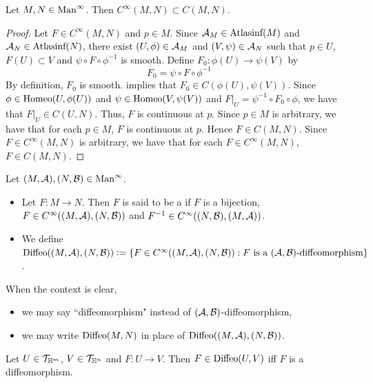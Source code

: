 \documentclass{book}
\begin{document}
\begin{ex} 
	Let $M, N \in \text{Man}^{\infty}$. Then $C^{\infty}(M,N) \subset C(M, N)$.
\end{ex}

\begin{proof}
	Let $F \in C^{\infty}(M,N)$ and $p \in M$. Since $\mathcal{A}_M \in \operatorname{\text{Atlasinf}}(M)$ and $\mathcal{A}_N \in \operatorname{\text{Atlasinf}}(N)$, there exist $(U, \phi) \in \mathcal{A}_M$ and $(V, \psi) \in \mathcal{A}_N$ such that $p \in U$, $F(U) \subset V$ and $\psi \circ F \circ \phi^{-1}$ is smooth. Define $F_0: \phi(U) \rightarrow \psi(V) $ by $$ F_0 = \psi \circ F \circ \phi^{-1}$$  
	By definition, $F_0$ is smooth.  implies that $F_0 \in C(\phi(U), \psi(V))$. Since $\phi \in \operatorname{\text{Homeo}}(U, \phi(U))$ and $\psi \in \operatorname{\text{Homeo}}(V, \psi(V))$ and $F|_U = \psi^{-1} \circ F_0 \circ \phi$, we have that $F|_U \in C(U, N)$. Thus, $F$ is continuous at $p$. Since $p \in M$ is arbitrary, we have that for each $p \in M$, $F$ is continuous at $p$. Hence $F \in C(M,N)$. Since $F \in C^{\infty}(M,N)$ is arbitrary, we have that for each $F \in C^{\infty}(M,N)$, $F \in C(M,N)$.
\end{proof}


\begin{defn} 
	Let $(M, \mathcal{A}), (N, \mathcal{B}) \in \text{Man}^{\infty}$.
	\begin{itemize}
		\item Let $F: M \rightarrow N$. Then $F$ is said to be a  if $F$ is a bijection, $F \in C^{\infty}((M, \mathcal{A}), (N, \mathcal{B}))$ and $F^{-1} \in C^{\infty}((N, \mathcal{B}), (M, \mathcal{A}))$.
		\item We define $\operatorname{\text{Diffeo}}((M, \mathcal{A}), (N, \mathcal{B})) \vcentcolon= \{F \in C^{\infty}((M, \mathcal{A}), (N, \mathcal{B})): \text{$F$ is a $(\mathcal{A},\mathcal{B})$-diffeomorphism}\}$.
	\end{itemize}
\end{defn}

\begin{note}
	When the context is clear, 
	\begin{itemize}
		\item we may say ``diffeomorphism" instead of $(\mathcal{A},\mathcal{B})$-diffeomorphism,
		\item we may write $\operatorname{\text{Diffeo}}(M, N)$ in place of $\operatorname{\text{Diffeo}}((M, \mathcal{A}), (N, \mathcal{B}))$.
	\end{itemize}
\end{note}

\begin{ex}
	Let $U \in \mathcal{T}_{\mathbb{H}^m}$, $V \in \mathcal{T}_{\mathbb{H}^n}$ and $F:U \rightarrow V$. Then $F \in \operatorname{\text{Diffeo}}(U, V)$ iff $F$ is a diffeomorphism.
\end{ex}
\end{document}
